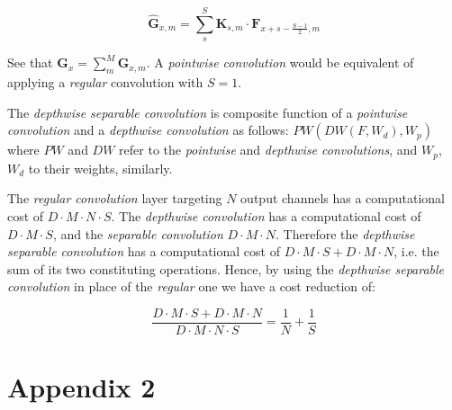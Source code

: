 \documentclass{elsarticle}
\begin{document}
\begin{equation}
\hat{\mathbf{G}}_{x, m} = \sum_{s}^{S} \mathbf{K}_{s, m} \cdot \mathbf{F}_{x+s-\frac{S-1}{2}, m} 
\label{eq:dw_conv}
\end{equation}

See that $\mathbf{G}_{x} =  \sum_{m}^{M} \hat{\mathbf{G}}_{x, m}$. A \textit{pointwise convolution} would be equivalent of applying a \textit{regular} convolution with $S=1$. 

The \textit{depthwise separable convolution} is composite function of a \textit{pointwise convolution} and a \textit{depthwise convolution} as follows: $PW(DW(F,W_{d}),W_{p})$ where $PW$ and $DW$ refer to the \textit{pointwise} and \textit{depthwise convolutions}, and $W_{p}$, $W_{d}$ to their weights, similarly.

The \textit{regular convolution} layer targeting $N$ output channels has a computational cost of $D \cdot M \cdot N \cdot S$. The \textit{depthwise convolution} has a computational cost of $D \cdot M \cdot S$,  and the \textit{separable convolution} $D \cdot M \cdot N$. Therefore the \textit{depthwise separable convolution} has a computational cost  of $D \cdot M  \cdot S + D \cdot M \cdot N$, i.e. the sum of its two constituting operations. Hence, by using the \textit{depthwise separable convolution} in place of the \textit{regular} one we have a cost reduction of:

$$ \frac{D \cdot M \cdot S  + D \cdot M \cdot N} {D \cdot M \cdot N \cdot S} = \frac{1}{N} + \frac{1}{S} $$


\newpage

\section*{Appendix 2}
\end{document}
